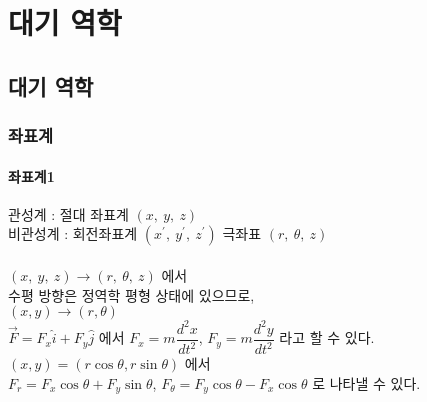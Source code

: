 
\part{대기 역학}



\chapter{대기 역학}



\section{좌표계}

\subsection{좌표계1}

관성계 : 절대 좌표계 $ (x,~y,~z)$ \\
비관성계 : 회전좌표계 $ (x^{\prime},~y^{\prime},~z^{\prime})$ 
극좌표 $ (r,~\theta,~z)$\\
\\
$ (x,~y,~z) 	\rightarrow (r,~\theta,~z)$ 에서 \\
수평 방향은 정역학 평형 상태에 있으므로, \\	

$ (x, y) 	\rightarrow (r, \theta)$\\

$ \overrightarrow {F} = F_{x} \hat{i}  + F_{y} \hat{j} $ 에서 
$ F_{x} = m \dfrac{d^{2}x}{dt^{2}}$, 
$ F_{y} = m \dfrac{d^{2}y}{dt^{2}}$ 라고 할 수 있다.  \\

$ (x, y) = (r \cos \theta, r \sin \theta)$ 에서 \\
$ F_{r} = F_{x} \cos \theta + F_{y} \sin \theta $, 
$ F_{\theta} = F_{y} \cos \theta - F_{x} \cos \theta $ 로 나타낼 수 있다. \\

